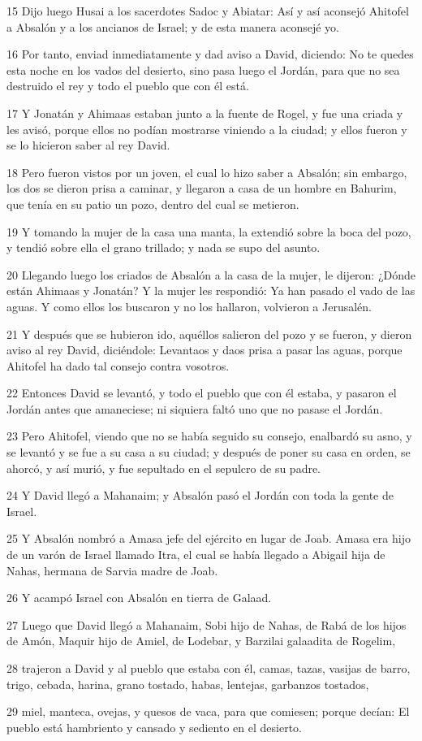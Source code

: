 \par 15 Dijo luego Husai a los sacerdotes Sadoc y Abiatar: Así y así aconsejó Ahitofel a Absalón y a los ancianos de Israel; y de esta manera aconsejé yo.
\par 16 Por tanto, enviad inmediatamente y dad aviso a David, diciendo: No te quedes esta noche en los vados del desierto, sino pasa luego el Jordán, para que no sea destruido el rey y todo el pueblo que con él está.
\par 17 Y Jonatán y Ahimaas estaban junto a la fuente de Rogel, y fue una criada y les avisó, porque ellos no podían mostrarse viniendo a la ciudad; y ellos fueron y se lo hicieron saber al rey David.
\par 18 Pero fueron vistos por un joven, el cual lo hizo saber a Absalón; sin embargo, los dos se dieron prisa a caminar, y llegaron a casa de un hombre en Bahurim, que tenía en su patio un pozo, dentro del cual se metieron.
\par 19 Y tomando la mujer de la casa una manta, la extendió sobre la boca del pozo, y tendió sobre ella el grano trillado; y nada se supo del asunto.
\par 20 Llegando luego los criados de Absalón a la casa de la mujer, le dijeron: ¿Dónde están Ahimaas y Jonatán? Y la mujer les respondió: Ya han pasado el vado de las aguas. Y como ellos los buscaron y no los hallaron, volvieron a Jerusalén.
\par 21 Y después que se hubieron ido, aquéllos salieron del pozo y se fueron, y dieron aviso al rey David, diciéndole: Levantaos y daos prisa a pasar las aguas, porque Ahitofel ha dado tal consejo contra vosotros.
\par 22 Entonces David se levantó, y todo el pueblo que con él estaba, y pasaron el Jordán antes que amaneciese; ni siquiera faltó uno que no pasase el Jordán.
\par 23 Pero Ahitofel, viendo que no se había seguido su consejo, enalbardó su asno, y se levantó y se fue a su casa a su ciudad; y después de poner su casa en orden, se ahorcó, y así murió, y fue sepultado en el sepulcro de su padre. 
\par 24 Y David llegó a Mahanaim; y Absalón pasó el Jordán con toda la gente de Israel.
\par 25 Y Absalón nombró a Amasa jefe del ejército en lugar de Joab. Amasa era hijo de un varón de Israel llamado Itra, el cual se había llegado a Abigail hija de Nahas, hermana de Sarvia madre de Joab.
\par 26 Y acampó Israel con Absalón en tierra de Galaad.
\par 27 Luego que David llegó a Mahanaim, Sobi hijo de Nahas, de Rabá de los hijos de Amón, Maquir hijo de Amiel, de Lodebar, y Barzilai galaadita de Rogelim,
\par 28 trajeron a David y al pueblo que estaba con él, camas, tazas, vasijas de barro, trigo, cebada, harina, grano tostado, habas, lentejas, garbanzos tostados,
\par 29 miel, manteca, ovejas, y quesos de vaca, para que comiesen; porque decían: El pueblo está hambriento y cansado y sediento en el desierto.


